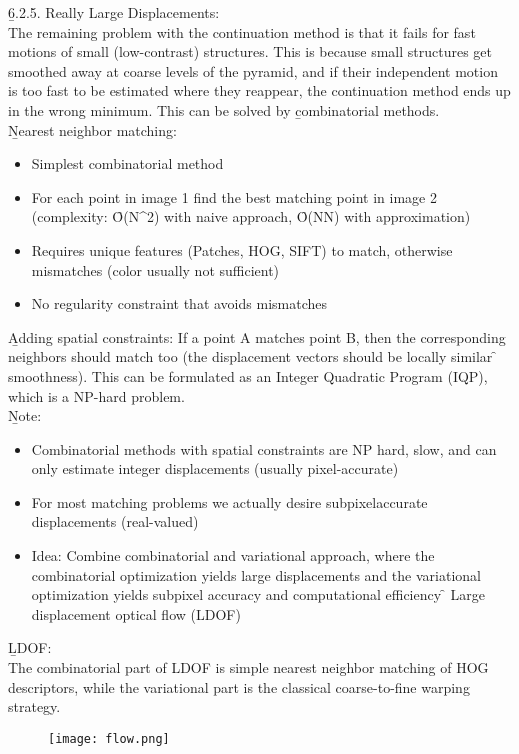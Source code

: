\newpage
\b{6.2.5. Really Large Displacements:\\[0.5em]}
The remaining problem with the continuation method is that it fails for fast motions of small (low-contrast) structures. This is because small structures get smoothed away at coarse levels of the pyramid, and if their independent motion is too fast to be estimated where they reappear, the continuation method ends up in the wrong minimum. This can be solved by \b{combinatorial methods}.\\

\b{Nearest neighbor matching:}
\begin{itemize}
    \item Simplest combinatorial method
    \item For each point in image 1 find the best matching point in image 2 (complexity: \f{O(N^2)} with naive approach, \f{O(N\log N)} with approximation)
    \item Requires unique features (Patches, HOG, SIFT) to match, otherwise mismatches (color usually not sufficient)
    \item No regularity constraint that avoids mismatches
\end{itemize}
\vspace{0.5em}
\b{Adding spatial constraints:} If a point A matches point B, then the corresponding neighbors should match too (the displacement vectors should be locally similar \f{\to} smoothness). This can be formulated as an Integer Quadratic Program (IQP), which is a NP-hard problem.\\

\b{Note:} 
\begin{itemize}
    \item Combinatorial methods with spatial constraints are NP hard, slow, and can only estimate integer displacements (usually pixel-accurate)
    \item For most matching problems we actually desire subpixelaccurate displacements (real-valued)
    \item Idea: Combine combinatorial and variational approach, where the combinatorial optimization yields large displacements and the variational optimization yields subpixel accuracy and computational efficiency \f{\to} Large displacement optical flow (LDOF)
\end{itemize}
\vspace{0.5em}
\b{LDOF:\\[0.5em]}
The combinatorial part of LDOF is simple nearest neighbor matching of HOG descriptors, while the variational part is the classical coarse-to-fine warping strategy.\\
\begin{figure}[h!]
    \centering
    \texttt{[image: flow.png]}
\end{figure}

